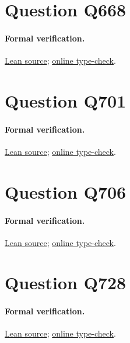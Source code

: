\documentclass[11pt]{article}
\begin{document}
\section{Question Q668}

\paragraph{Formal verification.}
\href{https://github.com/l-pommeret/rms-math-proofs/blob/dd59384b5ec727517bb95dc69f583e2dd565b5e7/lean/RMS/Q668.lean}{Lean source}; \href{https://github.com/l-pommeret/rms-math-proofs/actions/runs/31279584230}{online type-check}.

\section{Question Q701}

\paragraph{Formal verification.}
\href{https://github.com/l-pommeret/rms-math-proofs/blob/dd59384b5ec727517bb95dc69f583e2dd565b5e7/lean/RMS/Q701.lean}{Lean source}; \href{https://github.com/l-pommeret/rms-math-proofs/actions/runs/31279584230}{online type-check}.

\section{Question Q706}

\paragraph{Formal verification.}
\href{https://github.com/l-pommeret/rms-math-proofs/blob/c5045560e050e87c2214eeb99061aaeb0af217a6/lean/RMS/Q706.lean}{Lean source}; \href{https://github.com/l-pommeret/rms-math-proofs/actions/runs/31290249876}{online type-check}.

\section{Question Q728}

\paragraph{Formal verification.}
\href{https://github.com/l-pommeret/rms-math-proofs/blob/c1fe94109b22667c773dbecc9e7071d6a17f678f/lean/RMS/Q728.lean}{Lean source}; \href{https://github.com/l-pommeret/rms-math-proofs/actions/runs/31284977623}{online type-check}.
\end{document}
